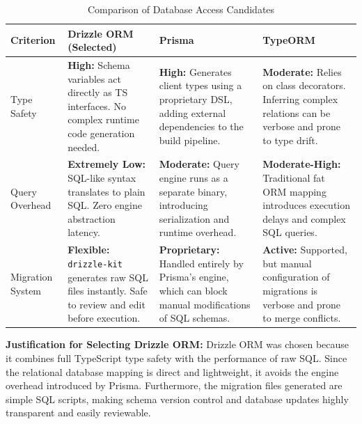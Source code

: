 \documentclass[letterpaper%
, oneside%
, 12pt%
, memoireprojet%
, english%
,creativecommons,hyperref, withAlgo2e %
]{thETS}
\begin{document}
\begin{table}[H]
\centering
\begin{tabular}{|p{2.5cm}|p{4.2cm}|p{4.2cm}|p{4.2cm}|}
\hline
\textbf{Criterion} & \textbf{Drizzle ORM (Selected)} & \textbf{Prisma} & \textbf{TypeORM} \\ \hline
Type Safety & \textbf{High:} Schema variables act directly as TS interfaces. No complex runtime code generation needed. & \textbf{High:} Generates client types using a proprietary DSL, adding external dependencies to the build pipeline. & \textbf{Moderate:} Relies on class decorators. Inferring complex relations can be verbose and prone to type drift. \\ \hline
Query Overhead & \textbf{Extremely Low:} SQL-like syntax translates to plain SQL. Zero engine abstraction latency. & \textbf{Moderate:} Query engine runs as a separate binary, introducing serialization and runtime overhead. & \textbf{Moderate-High:} Traditional fat ORM mapping introduces execution delays and complex SQL queries. \\ \hline
Migration System & \textbf{Flexible:} \texttt{drizzle-kit} generates raw SQL files instantly. Safe to review and edit before execution. & \textbf{Proprietary:} Handled entirely by Prisma's engine, which can block manual modifications of SQL schemas. & \textbf{Active:} Supported, but manual configuration of migrations is verbose and prone to merge conflicts. \\ \hline
\end{tabular}
\caption{Comparison of Database Access Candidates}
\label{tab:orm_comparison}
\end{table}

\textbf{Justification for Selecting Drizzle ORM:} Drizzle ORM was chosen because it combines full TypeScript type safety with the performance of raw SQL. Since the relational database mapping is direct and lightweight, it avoids the engine overhead introduced by Prisma. Furthermore, the migration files generated are simple SQL scripts, making schema version control and database updates highly transparent and easily reviewable.
\end{document}
